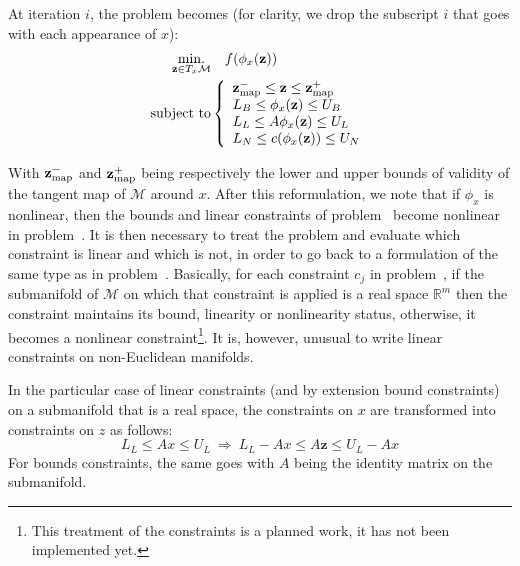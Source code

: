 At iteration $i$, the problem becomes (for clarity, we drop the subscript $i$ that goes with each appearance of $x$):
\begin{align}
\label{eq:optim_problem_on_txm}
  \operatorname*{min.}_{\mathbf{z} \in T_x\mathcal{M}} & \quad f(\phi_x(\mathbf{z}))\\ \nonumber
  \text{subject to}&\left\{
  \begin{array}{lr}
    {\bf z}_{\text{map}}^- \leq \mathbf{z} \leq {\bf z}_{\text{map}}^+ \\
    L_B \leq \phi_x(\mathbf{z}) \leq U_B \\
    L_L \leq A\phi_x(\mathbf{z}) \leq U_L \\
    L_N \leq c(\phi_x(\mathbf{z})) \leq U_N \\
  \end{array}\right.
\end{align}

With ${\bf z}_{\text{map}}^-$ and ${\bf z}_{\text{map}}^+$ being respectively the lower and upper bounds of validity of the tangent map of $\mathcal{M}$ around $x$.
After this reformulation, we note that if $\phi_x$ is nonlinear, then the bounds and linear constraints of problem~ become nonlinear in problem~.
It is then necessary to treat the problem and evaluate which constraint is linear and which is not, in order to go back to a formulation of the same type as in problem~.
Basically, for each constraint $c_j$ in problem~, if the submanifold of $\mathcal{M}$ on which that constraint is applied is a real space $\mathbb{R}^m$ then the constraint maintains its bound, linearity or nonlinearity status, otherwise, it becomes a nonlinear constraint\footnote{This treatment of the constraints is a planned work, it has not been implemented yet.}.
It is, however, unusual to write linear constraints on non-Euclidean manifolds.

In the particular case of linear constraints (and by extension bound constraints) on a submanifold that is a real space, the constraints on $x$ are transformed into constraints on $z$ as follows:
\begin{equation}
  L_L \leq Ax \leq U_L \ \Rightarrow \ L_L - Ax \leq A\mathbf{z} \leq U_L-Ax
\end{equation}
For bounds constraints, the same goes with $A$ being the identity matrix on the submanifold.

